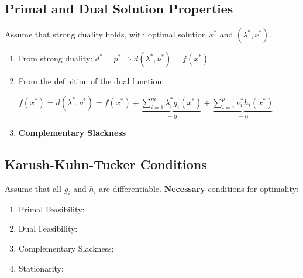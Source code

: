 \documentclass[8pt,a4paper]{scrartcl}
\begin{document}
\begin{multicols*}{3}
\subsection{Primal and Dual Solution Properties}

Assume that strong duality holds, with optimal solution $x^\ast$ and $(\lambda^\ast,\nu^\ast)$.

\begin{enumerate}
\ncompaq
\item From strong duality: $d^\ast=p^\ast\Rightarrow d(\lambda^\ast,\nu^\ast)=f(x^\ast)$
\item From the definition of the dual function:

$f(x^\ast)=d(\lambda^\ast,\nu^\ast)=f(x^\ast)+\underbrace{\sum\limits_{i=1}^m\lambda_i^\ast g_i(x^\ast)}_{=0}+\underbrace{\sum\limits_{i=1}^p\nu_i^\ast h_i(x^\ast)}_{=0}$
\item \textbf{Complementary Slackness}

\end{enumerate}

\subsection{Karush-Kuhn-Tucker Conditions}

Assume that all $g_i$ and $h_i$ are differentiable. \textbf{Necessary} conditions for optimality:

\begin{enumerate}
\ncompaq
\item Primal Feasibility:

\item Dual Feasibility:

\item Complementary Slackness:

\item Stationarity:

\end{enumerate}


\end{multicols*}
\end{document}
